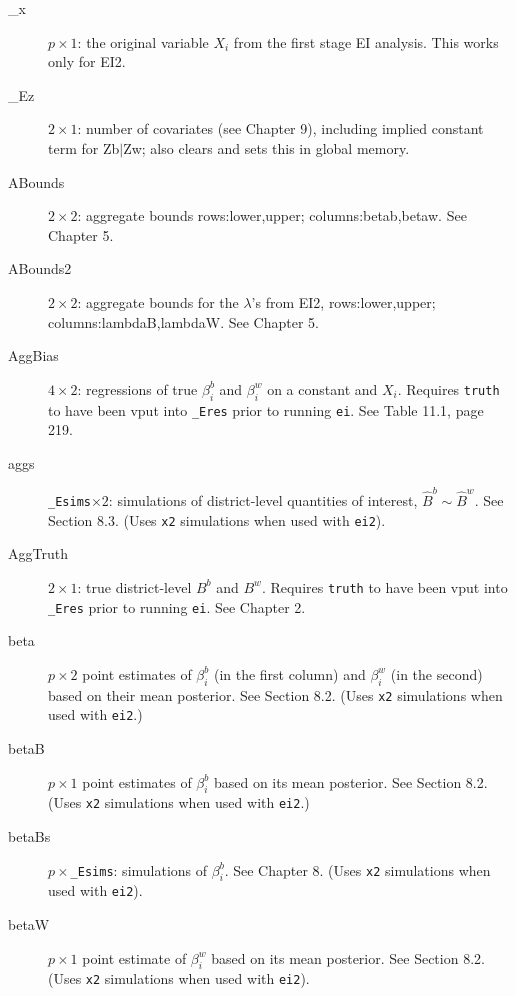\documentclass[11pt,titlepage]{article}
\begin{document}
\begin{description}
\item[\_x] $p\times 1$: the original variable $X_i$ from the first
  stage EI analysis.  This works only for EI2.

\item[\_Ez] $2\times 1$: number of covariates (see Chapter 9),
  including implied constant term for Zb$\vert$Zw; also clears and
  sets this in global memory.

\item[ABounds] $2\times 2$: aggregate bounds rows:lower,upper;
  columns:betab,betaw.  See Chapter 5.

\item[ABounds2] $2\times 2$: aggregate bounds for the $\lambda$'s from
  EI2, rows:lower,upper; columns:lambdaB,lambdaW.  See Chapter 5.

\item[AggBias] $4\times 2$: regressions of true $\beta_i^b$ and
  $\beta_i^w$ on a constant and $X_i$.  Requires \texttt{truth} to
  have been vput into \texttt{\_Eres} prior to running \texttt{ei}.
  See Table 11.1, page 219.

\item[aggs] \texttt{\_Esims}$\times 2$: simulations of district-level
  quantities of interest, $\hat{B}^b\sim\hat{B}^w$.  See Section 8.3.
  (Uses \texttt{x2} simulations when used with \texttt{ei2}).

\item[AggTruth] $2\times 1$: true district-level $B^b$ and $B^w$.
  Requires \texttt{truth} to have been vput into \texttt{\_Eres} prior
  to running \texttt{ei}.  See Chapter 2.

\item[beta] $p\times 2$ point estimates of $\beta_i^b$ (in the first
  column) and $\beta_i^w$ (in the second) based on their mean
  posterior.  See Section 8.2.  (Uses \texttt{x2} simulations when
  used with \texttt{ei2}.)

\item[betaB] $p\times 1$ point estimates of $\beta_i^b$ based on its
  mean posterior.  See Section 8.2.  (Uses \texttt{x2}
  simulations when used with \texttt{ei2}.)

\item[betaBs] $p\times$\texttt{\_Esims}: simulations of $\beta_i^b$.
  See Chapter 8.  (Uses \texttt{x2} simulations when used
  with \texttt{ei2}).

\item[betaW] $p\times 1$ point estimate of $\beta_i^w$ based on its
  mean posterior.  See Section 8.2.  (Uses \texttt{x2}
  simulations when used with \texttt{ei2}).


\end{description}
\end{document}
